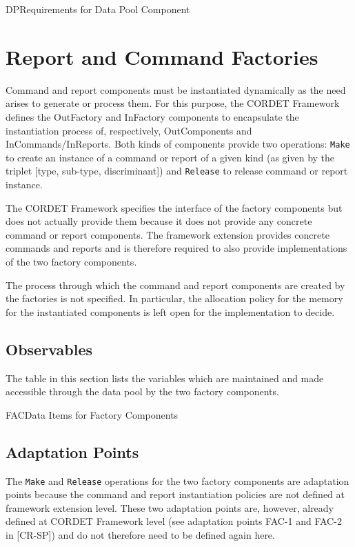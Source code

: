 \documentclass[a4paper,10pt]{article}
\let\stdsection\section
\renewcommand\section{\newpage\stdsection}
\newenvironment{cr_req}[2]
{
\begin{longtable}{|l|p{11.8cm}|}
\caption{#2}\label{tab:Req-#1} \\
\hline
\rowcolor{light-gray}
\textbf{Req. ID} & \textbf{Requirement Text}\\
\hline\hline
\endfirsthead
\rowcolor{light-gray}
\textbf{Req. ID} & \textbf{Requirement Text}\\
\hline\hline
\endhead
\DTLforeach*[\DTLiseq{\cat}{#1}]{dbReq}{\cat=Category,\type=Type,\id=Id,\reqText=Text}
{\DTLiffirstrow{}{\\\hline}P-\cat-\id/\type & \textit{\reqText}}\\\hline
}
{\end{longtable}}
\newenvironment{cr_obs}[2]
{
\begin{longtable}{|l|p{9.5cm}|}
\caption{#2}\label{tab:Obs-#1} \\
\hline
\rowcolor{light-gray}
\textbf{Name} & \textbf{Description}\\
\hline\hline
\endfirsthead
\rowcolor{light-gray}
\textbf{Name} & \textbf{Description}\\
\hline\hline
\endhead
\DTLforeach*[\DTLiseq{\cat}{#1}]{dbObs}{\cat=Category,\name=Name,\desc=Desc}
{\DTLiffirstrow{}{\\\hline}\texttt{\name} & \desc}\\\hline
}
{\end{longtable}}
\begin{document}
\begin{cr_req}{DP}{Requirements for Data Pool Component}
\end{cr_req}

\section{Report and Command Factories}\label{sec:repCmdFactories}
Command and report components must be instantiated dynamically as the need arises to generate or process them. For this purpose, the CORDET Framework defines the OutFactory and InFactory components to encapsulate the instantiation process of, respectively, OutComponents and InCommands/InReports. Both kinds of components provide two operations: \texttt{Make} to create an instance of a command or report of a given kind (as given by the triplet [type, sub-type, discriminant]) and \texttt{Release} to release command or report instance.

The CORDET Framework specifies the interface of the factory components but does not actually provide them because it does not provide any concrete command or report components. The framework extension provides concrete commands and reports and is therefore required to also provide implementations of the two factory components.

The process through which the command and report components are created by the factories is not specified. In particular, the allocation policy for the memory for the instantiated components is left open for the implementation to decide.

\subsection{Observables}
The table in this section lists the variables which are maintained and made accessible through the data pool by the two factory components.

\begin{cr_obs}{FAC}{Data Items for Factory Components}
\end{cr_obs}

\subsection{Adaptation Points}
The \texttt{Make} and \texttt{Release} operations for the two factory components are adaptation points because the command and report instantiation policies are not defined at framework extension level. These two adaptation points are, however, already defined at CORDET Framework level (see adaptation points FAC-1 and FAC-2 in [CR-SP]) and do not therefore need to be defined again here.
\end{document}
